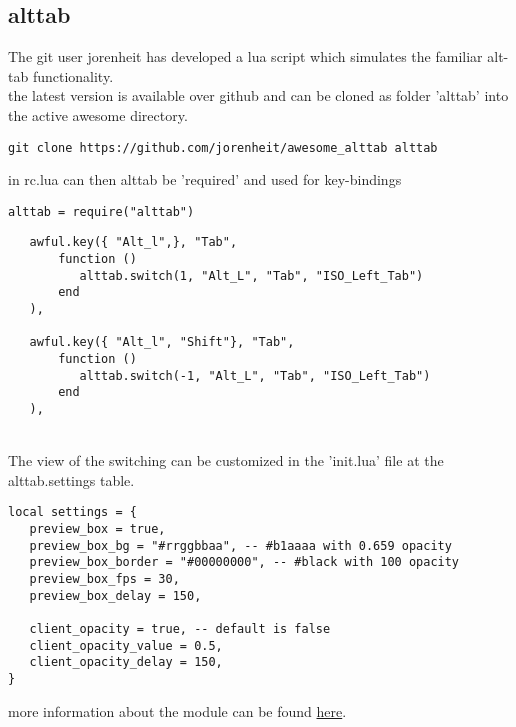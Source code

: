 \subsection{alttab} %
	The git user jorenheit has developed a lua script which simulates the familiar alt-tab functionality.\\
	the latest version is available over github and can be cloned as folder 'alttab' into the active awesome directory.
	\begin{lstlisting}
git clone https://github.com/jorenheit/awesome_alttab alttab
	\end{lstlisting}
	
	\noindent in rc.lua can then alttab be 'required' and used for key-bindings
	\begin{lstlisting}
alttab = require("alttab")	
	\end{lstlisting}
	
	\begin{lstlisting}
   awful.key({ "Alt_l",}, "Tab",                                                      
       function ()                                                                              
          alttab.switch(1, "Alt_L", "Tab", "ISO_Left_Tab")                                             
       end                                                                                      
   ),                                                                                           
                                                                                                
   awful.key({ "Alt_l", "Shift"}, "Tab",                                                      
       function ()                                                                              
          alttab.switch(-1, "Alt_L", "Tab", "ISO_Left_Tab")                                            
       end                                                                                      
   ),	
	\end{lstlisting}
	
	\noindent \\The view of the switching can be customized in the 'init.lua' file at the alttab.settings table.
	\begin{lstlisting}
local settings = { 
   preview_box = true,
   preview_box_bg = "#rrggbbaa", -- #b1aaaa with 0.659 opacity
   preview_box_border = "#00000000", -- #black with 100 opacity
   preview_box_fps = 30, 
   preview_box_delay = 150,

   client_opacity = true, -- default is false
   client_opacity_value = 0.5,
   client_opacity_delay = 150,
}
	\end{lstlisting}
	
	more information about the module can be found \href{https://awesomewm.org/wiki/Familiar_Alt_Tab}{here}.
	